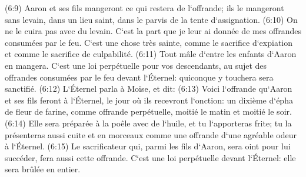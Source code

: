 \verse (6:9) Aaron et ses fils mangeront ce qui restera de l`offrande; ils le mangeront sans levain, dans un lieu saint, dans le parvis de la tente d`assignation. 
\verse (6:10) On ne le cuira pas avec du levain. C`est la part que je leur ai donnée de mes offrandes consumées par le feu. C`est une chose très sainte, comme le sacrifice d`expiation et comme le sacrifice de culpabilité. 
\verse (6:11) Tout mâle d`entre les enfants d`Aaron en mangera. C`est une loi perpétuelle pour vos descendants, au sujet des offrandes consumées par le feu devant l`Éternel: quiconque y touchera sera sanctifié. 
\verse (6:12) L`Éternel parla à Moïse, et dit: 
\verse (6:13) Voici l`offrande qu`Aaron et ses fils feront à l`Éternel, le jour où ils recevront l`onction: un dixième d`épha de fleur de farine, comme offrande perpétuelle, moitié le matin et moitié le soir. 
\verse (6:14) Elle sera préparée à la poêle avec de l`huile, et tu l`apporteras frite; tu la présenteras aussi cuite et en morceaux comme une offrande d`une agréable odeur à l`Éternel. 
\verse (6:15) Le sacrificateur qui, parmi les fils d`Aaron, sera oint pour lui succéder, fera aussi cette offrande. C`est une loi perpétuelle devant l`Éternel: elle sera brûlée en entier. 
